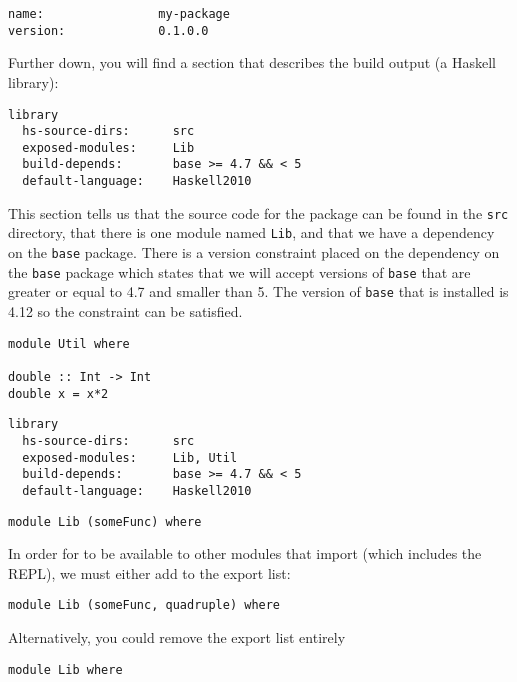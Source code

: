 \begin{verbatim}
name:                my-package
version:             0.1.0.0
\end{verbatim}
Further down, you will find a section that describes the build output (a Haskell library):
\begin{verbatim}
library
  hs-source-dirs:      src
  exposed-modules:     Lib
  build-depends:       base >= 4.7 && < 5
  default-language:    Haskell2010
\end{verbatim}
This section tells us that the source code for the package can be found in the \texttt{\small src} directory, that there is one module named \texttt{\small Lib}, and that we have a dependency on the \texttt{\small base} package. There is a version constraint placed on the dependency on the \texttt{\small base} package which states that we will accept versions of \texttt{\small base} that are greater or equal to 4.7 and smaller than 5. The version of \texttt{\small base} that is installed is 4.12 so the constraint can be satisfied.

\begin{verbatim}
module Util where 

double :: Int -> Int 
double x = x*2
\end{verbatim}
\begin{verbatim}
library
  hs-source-dirs:      src
  exposed-modules:     Lib, Util
  build-depends:       base >= 4.7 && < 5
  default-language:    Haskell2010
\end{verbatim}
\begin{verbatim}
module Lib (someFunc) where
\end{verbatim}
In order for  to be available to other modules that import  (which includes the REPL), we must either add  to the export list:
\begin{verbatim}
module Lib (someFunc, quadruple) where
\end{verbatim}
Alternatively, you could  remove the export list entirely
\begin{verbatim}
module Lib where
\end{verbatim}

